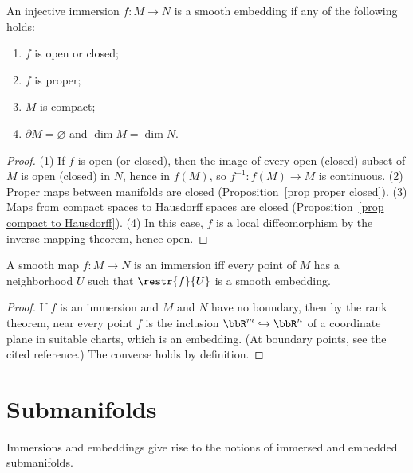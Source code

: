 \begin{prop}\label{prop injective immersion embedding}
    An injective immersion $f:M\to N$ is a smooth embedding if any of the following holds:
    \begin{enumerate}
        \item $f$ is open or closed;
        \item $f$ is proper;
        \item $M$ is compact;
        \item $\partial M=\varnothing$ and $\dim M=\dim N$.
    \end{enumerate}
\end{prop}
\begin{proof}
    (1) If $f$ is open (or closed), then the image of every open (closed) subset of $M$ is open (closed) in $N$, hence in $f(M)$, so $f^{-1}:f(M)\to M$ is continuous. (2) Proper maps between manifolds are closed (Proposition~\ref{prop proper closed}). (3) Maps from compact spaces to Hausdorff spaces are closed (Proposition~\ref{prop compact to Hausdorff}). (4) In this case, $f$ is a local diffeomorphism by the inverse mapping theorem, hence open.
\end{proof}

\begin{thm}\label{thm.local embedding}
    A smooth map $f:M\to N$ is an immersion iff every point of $M$ has a neighborhood $U$ such that $\restr{f}{U}$ is a smooth embedding.
\end{thm}
\begin{proof}
    If $f$ is an immersion and $M$ and $N$ have no boundary, then by the rank theorem, near every point $f$ is the inclusion $\bbR^m\hookrightarrow\bbR^n$ of a coordinate plane in suitable charts, which is an embedding. (At boundary points, see the cited reference.) The converse holds by definition.
\end{proof}


\section{Submanifolds}\label{sec submanifolds}
Immersions and embeddings give rise to the notions of immersed and embedded submanifolds.

